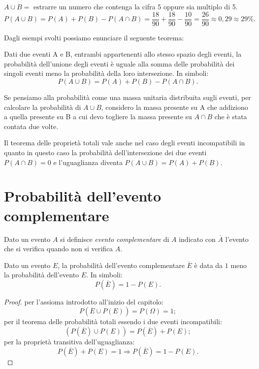 \begin{exrig}
\begin{esempio}
$A\cup B =$ estrarre un numero che contenga la cifra 5 oppure sia multiplo di 5. \[ P(A\cup B)=P(A)+P(B)-P(A\cap B)=\frac{18}{90}+\frac{18}{90}-\frac{10}{90}=\frac{26}{90}\approx 0,29\approx 29\%. \]
\end{esempio}
\end{exrig}

Dagli esempi svolti possiamo enunciare il seguente teorema:

\begin{teorema}
Dati due eventi A e B, entrambi appartenenti allo stesso spazio degli eventi, la probabilità dell'unione degli eventi è uguale alla somma delle probabilità dei singoli eventi meno la probabilità della loro intersezione.
In simboli: \[ P(A\cup B)=P(A)+P(B)-P(A\cap B). \]
\end{teorema}
Se pensiamo alla probabilità come una massa unitaria distribuita sugli eventi, per calcolare la probabilità di $A\cup B$, considero la massa presente su A che addiziono a quella presente su B a cui devo togliere la massa presente su $A\cap B$ che è stata contata due volte.

\osservazione Il teorema delle proprietà totali vale anche nel caso degli eventi incompatibili in quanto in questo caso la probabilità dell'intersezione dei due eventi $P(A\cap B)=0$ e l'uguaglianza diventa $P(A\cup B)=P(A)+P(B)$.

\vspazio{}

\section{Probabilità dell'evento complementare }
Dato un evento $A$ si definisce \emph{evento complementare} di $A$ indicato con $\overline A$ l'evento che si verifica quando non si verifica $A$.
\begin{teorema}
Dato un evento $E$, la probabilità dell'evento complementare $\overline E$ è data da $1$ meno la probabilità dell'evento $E$. In simboli: \[ P(\overline E)=1-P(E). \]
\end{teorema}
\begin{proof} per l'assioma introdotto all'inizio del capitolo: \[ P(\overline E\cup P(E))=P(\Omega )=1; \]
per il teorema delle probabilità totali essendo i due eventi incompatibili: \[ (P(\overline E)\cup P(E))=P(\overline E)+P(E); \]
per la proprietà transitiva dell'uguaglianza: \[ P(\overline E)+P(E)=1 \Rightarrow P(\overline E)=1-P(E). \]
\end{proof}


